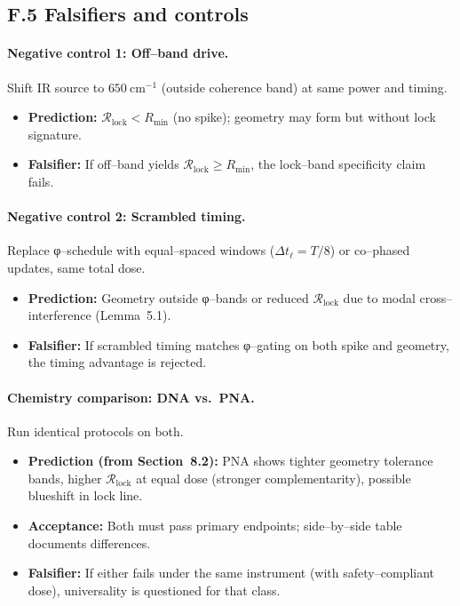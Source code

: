 \documentclass[11pt]{article}
\begin{document}
\subsection*{F.5 Falsifiers and controls}

\paragraph{Negative control 1: Off–band drive.}
Shift IR source to $650~\mathrm{cm^{-1}}$ (outside coherence band) at same power and timing.
\begin{itemize}
\item \textbf{Prediction:} $\mathcal{R}_{\mathrm{lock}}<R_{\min}$ (no spike); geometry may form but without lock signature.
\item \textbf{Falsifier:} If off–band yields $\mathcal{R}_{\mathrm{lock}}\ge R_{\min}$, the lock–band specificity claim fails.
\end{itemize}

\paragraph{Negative control 2: Scrambled timing.}
Replace φ–schedule with equal–spaced windows ($\Delta t_\ell=T/8$) or co–phased updates, same total dose.
\begin{itemize}
\item \textbf{Prediction:} Geometry outside φ–bands or reduced $\mathcal{R}_{\mathrm{lock}}$ due to modal cross–interference (Lemma~5.1).
\item \textbf{Falsifier:} If scrambled timing matches φ–gating on both spike and geometry, the timing advantage is rejected.
\end{itemize}

\paragraph{Chemistry comparison: DNA vs.\ PNA.}
Run identical protocols on both.
\begin{itemize}
\item \textbf{Prediction (from Section~8.2):} PNA shows tighter geometry tolerance bands, higher $\mathcal{R}_{\mathrm{lock}}$ at equal dose (stronger complementarity), possible blueshift in lock line.
\item \textbf{Acceptance:} Both must pass primary endpoints; side–by–side table documents differences.
\item \textbf{Falsifier:} If either fails under the same instrument (with safety–compliant dose), universality is questioned for that class.
\end{itemize}
\end{document}
